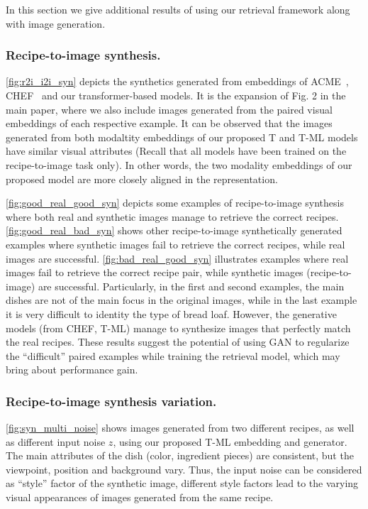 \documentclass[sigconf,nonacm]{acmart}
\begin{document}
\begin{multicols}{2}
In this section we give additional results of using our retrieval framework along with image generation.

\subsubsection*{\textbf{Recipe-to-image synthesis}.}
\autoref{fig:r2i_i2i_syn} depicts the synthetics generated from embeddings of ACME~\cite{wang2019}, CHEF~\cite{chef2021} and our transformer-based models. It is the expansion of Fig. 2 in the main paper, where we also include images generated from the paired visual embeddings of each respective example. It can be observed that the images generated from both modaltity embeddings of our proposed T and T-ML models have similar visual attributes (Recall that all models have been trained on the recipe-to-image task only). In other words, the two modality embeddings of our proposed model are more closely aligned in the representation.

\autoref{fig:good_real_good_syn} depicts some examples of recipe-to-image synthesis where both real and synthetic images manage to retrieve the correct recipes. \autoref{fig:good_real_bad_syn} shows other recipe-to-image synthetically generated examples where synthetic images fail to retrieve the correct recipes, while real images are successful. \autoref{fig:bad_real_good_syn} illustrates examples where real images fail to retrieve the correct recipe pair, while synthetic images (recipe-to-image) are successful. Particularly, in the first and second examples, the main dishes are not of the main focus in the original images, while in the last example it is very difficult to identity the type of bread loaf. However, the generative models (from CHEF, T-ML) manage to synthesize images that perfectly match the real recipes. These results suggest the potential of using GAN to regularize the ``difficult'' paired examples while training the retrieval model, which may bring about performance gain.



\subsubsection*{\textbf{Recipe-to-image synthesis variation.}}
\autoref{fig:syn_multi_noise} shows images generated from two different recipes, as well as different input noise $z$, using our proposed T-ML embedding and generator. The main attributes of the dish (color, ingredient pieces) are consistent, but the viewpoint, position and background vary. Thus, the input noise can be considered as ``style'' factor of the synthetic image,  different style factors lead to the varying visual appearances of images generated from the same recipe.










\end{multicols}
\end{document}
